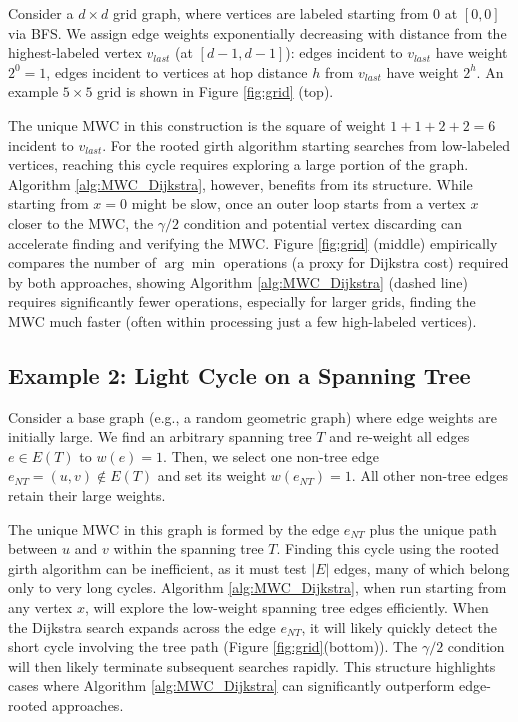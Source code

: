 \documentclass{article}
\begin{document}
Consider a $d \times d$ grid graph, where vertices are labeled starting from $0$ at $[0,0]$ via BFS. We assign edge weights exponentially decreasing with distance from the highest-labeled vertex $v_{last}$ (at $[d-1, d-1]$): edges incident to $v_{last}$ have weight $2^0=1$, edges incident to vertices at hop distance $h$ from $v_{last}$ have weight $2^h$. An example $5 \times 5$ grid is shown in Figure \ref{fig:grid} (top).

The unique MWC in this construction is the square of weight $1+1+2+2 = 6$ incident to $v_{last}$. For the rooted girth algorithm starting searches from low-labeled vertices, reaching this cycle requires exploring a large portion of the graph. Algorithm \ref{alg:MWC_Dijkstra}, however, benefits from its structure. While starting from $x=0$ might be slow, once an outer loop starts from a vertex $x$ closer to the MWC, the $\gamma/2$ condition and potential vertex discarding can accelerate finding and verifying the MWC. Figure \ref{fig:grid} (middle) empirically compares the number of $\arg\min$ operations (a proxy for Dijkstra cost) required by both approaches, showing Algorithm \ref{alg:MWC_Dijkstra} (dashed line) requires significantly fewer operations, especially for larger grids, finding the MWC much faster (often within processing just a few high-labeled vertices).




\subsection{Example 2: Light Cycle on a Spanning Tree}
\label{subsec:example_spanning_tree}

Consider a base graph (e.g., a random geometric graph) where edge weights are initially large. We find an arbitrary spanning tree $T$ and re-weight all edges $e \in E(T)$ to $w(e)=1$. Then, we select one non-tree edge $e_{NT} = (u,v) \notin E(T)$ and set its weight $w(e_{NT})=1$. All other non-tree edges retain their large weights.

The unique MWC in this graph is formed by the edge $e_{NT}$ plus the unique path between $u$ and $v$ within the spanning tree $T$. Finding this cycle using the rooted girth algorithm can be inefficient, as it must test $|E|$ edges, many of which belong only to very long cycles. Algorithm \ref{alg:MWC_Dijkstra}, when run starting from any vertex $x$, will explore the low-weight spanning tree edges efficiently. When the Dijkstra search expands across the edge $e_{NT}$, it will likely quickly detect the short cycle involving the tree path (Figure \ref{fig:grid}(bottom)). The $\gamma/2$ condition will then likely terminate subsequent searches rapidly. This structure highlights cases where Algorithm \ref{alg:MWC_Dijkstra} can significantly outperform edge-rooted approaches.
\end{document}
